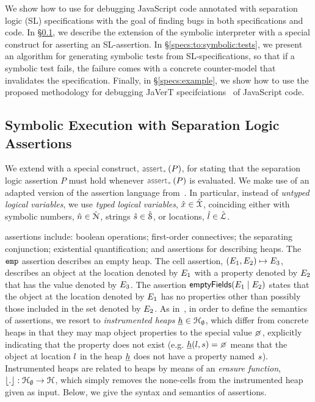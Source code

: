 
We show how to use \jilette for debugging JavaScript code annotated with 
separation logic (SL) specifications with the goal of finding bugs in both 
 specifications and code. In \S\ref{subsec:sep:assertions}, we describe the 
extension of the \jsil symbolic interpreter with a special construct for asserting
an SL-assertion. In \S\ref{specs:to:symbolic:tests}, we present an algorithm  
for generating symbolic tests from SL-specifications, so that if a 
symbolic test fails, the failure comes with a concrete counter-model that invalidates 
the specification. Finally, in \S\ref{specs:example}, we show how to use the 
proposed methodology for debugging JaVerT specifciations~\cite{javert} of JavaScript code. 

\subsection{\jsil Symbolic Execution with Separation Logic Assertions}
\label{subsec:sep:assertions}

We extend \jsil with a special construct, $\sepassert(P)$, for stating that 
the separation logic assertion $P$ must hold whenever $\sepassert(P)$ is evaluated. 
We make use of an adapted version of the assertion language from~\cite{javert}. 
In particular, instead of \emph{untyped logical variables}, we 
use \emph{typed logical variables}, $\hat{x} \in \hat{\mathcal{X}}$, coinciding either with 
symbolic numbers, $\hat{n} \in \hat{\mathcal{N}}$, strings $\hat{s} \in \hat{\mathcal{S}}$, 
or locations, $\hat{l} \in \hat{{\mathcal L}}$. 

\jsil assertions include: boolean operations; first-order connectives; the separating conjunction; 
existential quantification; and assertions for describing heaps. The $\texttt{emp}$ assertion describes 
an empty heap. The cell assertion, $(E_1,E_2) \mapsto E_3$,  describes an object 
at the location denoted by $E_1$ with a property denoted by $E_2$ that has the value 
denoted by $E_3$. The assertion $\mathsf{emptyFields}(E_1 \mid E_2)$ states that the object at 
the location denoted by $E_1$ has no properties other than possibly those included in the
set denoted by $E_2$. 
%
As in~\cite{gardner:popl:2012,javert}, in order to define the semantics of assertions, 
we resort to \emph{instrumented heaps} $\underline{h} \in {\mathcal H}_\emptyset$, which differ from 
concrete heaps in that they may map object properties to the special value $\none$, 
explicitly indicating that the property does not exist (e.g. $\iheap(\loc, \jstring) = \none$
means that the object at location $l$ in the heap $\underline{h}$ does not have a property
named $s$). 
Instrumented heaps are related to heaps by means of an \emph{erasure 
function}, $\lfloor . \rfloor: {\mathcal H}_\emptyset \rightarrow {\mathcal H}$, %
which simply removes the none-cells from the instrumented heap given as input.  Below, we give the syntax and semantics of \jsil assertions. 


